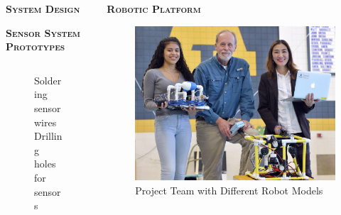\documentclass[final,t]{beamer}
\begin{document}
\begin{frame}{}
\begin{columns}
\begin{column}{.5\linewidth}
\begin{alertblock}{\textsc{\textbf{System Design}}}
\begin{block}{\textsc{\textbf{Sensor System Prototypes}}}
\begin{center}
\begin{figure}
\begin{tabular}{cc}
                    \end{tabular}
                    \caption{Soldering sensor wires \hspace{30mm} Drilling holes for sensors}
                    \end{figure}
                    \end{center}

  					\end{block}
                \end{alertblock}
            \end{column}

            \begin{column}{.5\linewidth}

                \begin{block}{\textsc{\textbf{Robotic Platform}}}
                    \vspace*{3mm}
                    \begin{figure}
                    \centering
                        \includegraphics[scale = 0.9]{assets/group_pic.jpg}
                        \caption{Project Team with Different Robot Models}
                    \end{figure}


\end{block}
\end{column}
\end{columns}
\end{frame}
\end{document}
